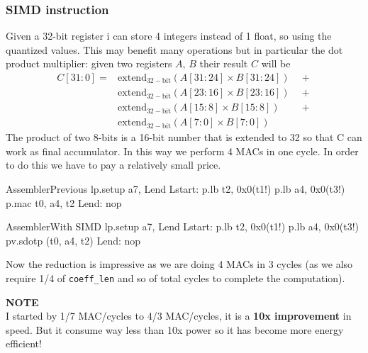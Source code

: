 \subsubsection{SIMD instruction}
Given a 32-bit register i can store 4 integers instead of 1 float, so using the quantized values. This may benefit many operations but in particular the dot product multiplier: given two registers $A$, $B$ their result $C$ will be 
\[
\begin{aligned}
C[31:0] = & \operatorname{extend_{32-bit}}(A[31:24] \times B[31:24]) \quad + \\
          & \operatorname{extend_{32-bit}}(A[23:16] \times B[23:16]) \quad + \\
          & \operatorname{extend_{32-bit}}(A[15:8]  \times B[15:8])  \quad \quad + \\
          & \operatorname{extend_{32-bit}}(A[7:0]   \times B[7:0])
\end{aligned}
\]
The product of two 8-bits is a 16-bit number that is extended to 32 so that C can work as final accumulator. In this way we perform 4 MACs in one cycle. In order to do this we have to pay a relatively small price. 
\begin{center}
\begin{minipage}[t]{0.45\textwidth}
\begin{MyCode}{Assembler}{Previous}
lp.setup a7, Lend
Lstart:
    p.lb t2, 0x0(t1!)
    p.lb a4, 0x0(t3!)
    p.mac t0, a4, t2
Lend: nop
\end{MyCode}
\end{minipage}
\hfill
\begin{minipage}[t]{0.45\textwidth}
\begin{MyCode}{Assembler}{With SIMD}
lp.setup a7, Lend
Lstart:
    p.lb t2, 0x0(t1!)
    p.lb a4, 0x0(t3!)
    pv.sdotp (t0, a4, t2)
Lend: nop
\end{MyCode}
\end{minipage}
\end{center}
Now the reduction is impressive as we are doing 4 MACs in 3 cycles (as we also require 1/4 of \verb|coeff_len| and so of total cycles to complete the computation).

\begin{mybox}
    \textbf{NOTE} \\
    I started by 1/7 MAC/cycles to 4/3 MAC/cycles, it is a \textbf{10x improvement} in speed. But it consume way less than 10x power so it has become more energy efficient!
\end{mybox}

